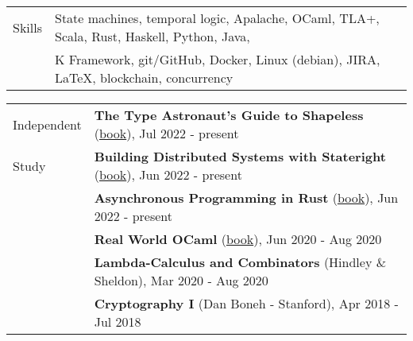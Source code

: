 \documentclass[letterpaper,10pt,oneside]{article}
\begin{document}
\newpage


\noindent \begin{tabular}{@{} l l}
 \Large{Skills} & State machines, temporal logic, Apalache, OCaml, TLA+, Scala, Rust, Haskell, Python, Java, \\
 \hspace{1.1in} & K Framework, git/GitHub, Docker, Linux (debian), JIRA, \LaTeX, blockchain, concurrency \\
\end{tabular}

\vfill


\noindent \begin{tabular}{@{} l l}
 \Large{Independent} & \textbf{The Type Astronaut's Guide to Shapeless} (\href{https://books.underscore.io/shapeless-guide/shapeless-guide.html}{book}), Jul 2022 - present \\
 \Large{Study} & \textbf{Building Distributed Systems with Stateright} (\href{https://www.stateright.rs/title-page.html}{book}), Jun 2022 - present \\
 \hspace{1.1in} & \textbf{Asynchronous Programming in Rust} (\href{https://github.com/rust-lang/async-book}{book}), Jun 2022 - present \\
 & \textbf{Real World OCaml} (\href{https://dev.realworldocaml.org/index.html}{book}), Jun 2020 - Aug 2020 \\
 & \textbf{Lambda-Calculus and Combinators} (Hindley \& Sheldon), Mar 2020 - Aug 2020 \\
 & \textbf{Cryptography I} (Dan Boneh - Stanford), Apr 2018 - Jul 2018 \\
\end{tabular}
\end{document}
